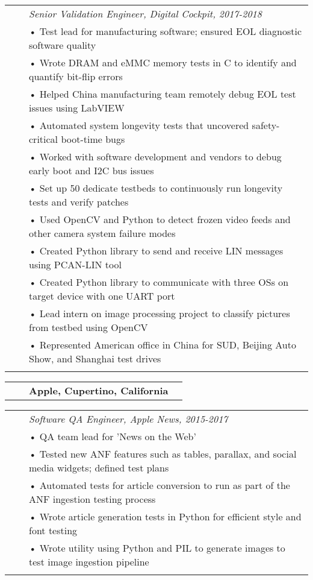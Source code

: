 \documentclass{minimal}
\begin{document}
\begin{tabular}{ p{1.5cm} p{1cm} p{16cm} }
& & \textit{Senior Validation Engineer, Digital Cockpit, 2017-2018}\\
& & • Test lead for manufacturing software; ensured EOL diagnostic software quality\\
& & • Wrote DRAM and eMMC memory tests in C to identify and quantify bit-flip errors\\
& & • Helped China manufacturing team remotely debug EOL test issues using LabVIEW\\
& & • Automated system longevity tests that uncovered safety-critical boot-time bugs\\
& & • Worked with software development and vendors to debug early boot and I2C bus issues\\
& & • Set up 50 dedicate testbeds to continuously run longevity tests and verify patches\\
& & • Used OpenCV and Python to detect frozen video feeds and other camera system failure modes\\
& & • Created Python library to send and receive LIN messages using PCAN-LIN tool\\
& & • Created Python library to communicate with three OSs on target device with one UART port\\
& & • Lead intern on image processing project to classify pictures from testbed using OpenCV\\
& & • Represented American office in China for SUD, Beijing Auto Show, and Shanghai test drives\\
& & \\
\end{tabular}

\begin{tabular}{ p{1.5cm} p{1cm} p{10cm} >{\raggedleft\arraybackslash}p{3cm} }
& & \textbf{Apple, Cupertino, California} & \\
\end{tabular}

\begin{tabular}{ p{1.5cm} p{1cm} p{16cm} }
& & \textit{Software QA Engineer, Apple News, 2015-2017}\\
& & • QA team lead for 'News on the Web'\\
& & • Tested new ANF features such as tables, parallax, and social media widgets; defined test plans\\
& & • Automated tests for article conversion to run as part of the ANF ingestion testing process\\
& & • Wrote article generation tests in Python for efficient style and font testing\\
& & • Wrote utility using Python and PIL to generate images to test image ingestion pipeline\\
& & \\
\end{tabular}
\end{document}
